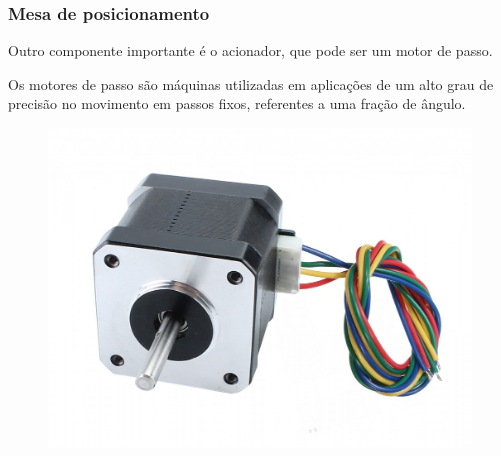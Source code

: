 \begin{frame}
\frametitle{Mesa de posicionamento}

Outro componente importante é o acionador, que pode ser um motor de passo. 

Os motores de passo são máquinas utilizadas em aplicações de um alto grau de precisão no movimento em passos fixos, referentes a uma fração de ângulo. 

\begin{figure}
\centering
\includegraphics[scale = 0.07]{figuras/motordepassoex}
\end{figure}
\end{frame}
